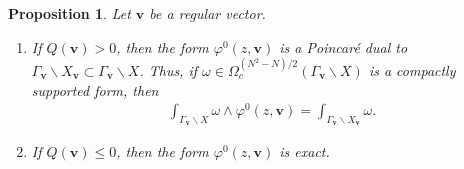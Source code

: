 \documentclass[a4paper,11pt]{amsart} %
\newcommand{\8}{\infty}
\newcommand{\vbf}{\mathbf{v}}
\theoremstyle{mytheoremstyle}
\newtheorem{prop}[thm]{Proposition}
\theoremstyle{remark}
\numberwithin{equation}{section}
\begin{document}
\begin{prop} \label{thomformprop2} Let $\vbf$ be a regular vector. 
\begin{enumerate} \item  If $Q(\vbf)>0$, then the form $\varphi^0(z,\vbf)$ is a Poincaré dual to $\Gamma_\vbf \backslash X_\vbf \subset \Gamma_\vbf \backslash X$. Thus, if $\omega \in \Omega_c^{(N^2-N)/2}(\Gamma_\vbf \backslash X)$ is a compactly supported form, then
\begin{align} 
\int_{\Gamma_\vbf \backslash X} \omega \wedge \varphi^0(z,\vbf)=\int_{\Gamma_\vbf \backslash X_\vbf} \omega.
\end{align}
\item  If $Q(\vbf) \leq 0$, then the form $\varphi^0(z,\vbf)$ is exact.
\end{enumerate}
\end{prop}
\end{document}
